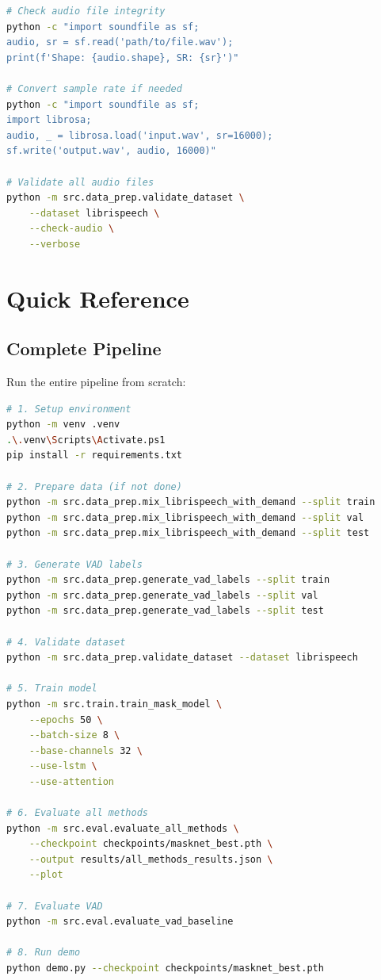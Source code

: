 \documentclass[12pt,a4paper]{article}
\begin{document}
\begin{lstlisting}[language=bash]
# Check audio file integrity
python -c "import soundfile as sf; 
audio, sr = sf.read('path/to/file.wav'); 
print(f'Shape: {audio.shape}, SR: {sr}')"

# Convert sample rate if needed
python -c "import soundfile as sf; 
import librosa; 
audio, _ = librosa.load('input.wav', sr=16000); 
sf.write('output.wav', audio, 16000)"

# Validate all audio files
python -m src.data_prep.validate_dataset \
    --dataset librispeech \
    --check-audio \
    --verbose
\end{lstlisting}

\section{Quick Reference}

\subsection{Complete Pipeline}

Run the entire pipeline from scratch:

\begin{lstlisting}[language=bash]
# 1. Setup environment
python -m venv .venv
.\.venv\Scripts\Activate.ps1
pip install -r requirements.txt

# 2. Prepare data (if not done)
python -m src.data_prep.mix_librispeech_with_demand --split train
python -m src.data_prep.mix_librispeech_with_demand --split val
python -m src.data_prep.mix_librispeech_with_demand --split test

# 3. Generate VAD labels
python -m src.data_prep.generate_vad_labels --split train
python -m src.data_prep.generate_vad_labels --split val
python -m src.data_prep.generate_vad_labels --split test

# 4. Validate dataset
python -m src.data_prep.validate_dataset --dataset librispeech

# 5. Train model
python -m src.train.train_mask_model \
    --epochs 50 \
    --batch-size 8 \
    --base-channels 32 \
    --use-lstm \
    --use-attention

# 6. Evaluate all methods
python -m src.eval.evaluate_all_methods \
    --checkpoint checkpoints/masknet_best.pth \
    --output results/all_methods_results.json \
    --plot

# 7. Evaluate VAD
python -m src.eval.evaluate_vad_baseline

# 8. Run demo
python demo.py --checkpoint checkpoints/masknet_best.pth
\end{lstlisting}
\end{document}
